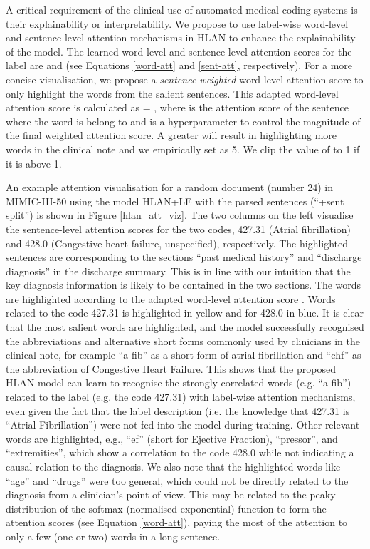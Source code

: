\documentclass[final,5p,times,twocolumn]{elsarticle}
\begin{document}
A critical requirement of the clinical use of automated medical coding systems is their explainability or interpretability. We propose to use label-wise word-level and sentence-level attention mechanisms in HLAN to enhance the explainability of the model. The learned word-level and sentence-level attention scores for the label  are  and  (see Equations \ref{word-att} and \ref{sent-att}, respectively). For a more concise visualisation, we propose a \textit{sentence-weighted} word-level attention score  to only highlight the words from the salient sentences. This adapted word-level attention score is calculated as  = , where  is the attention score of the sentence where the word is belong to and  is a hyperparameter to control the magnitude of the final weighted attention score. A greater  will result in highlighting more words in the clinical note and we empirically set  as 5. We clip the value of  to 1 if it is above 1.

An example attention visualisation for a random document (number 24) in MIMIC-III-50 using the model HLAN+LE with the parsed sentences (``+sent split'') is shown in Figure \ref{hlan_att_viz}. The two columns on the left visualise the sentence-level attention scores  for the two codes, 427.31 (Atrial fibrillation) and 428.0 (Congestive heart failure, unspecified), respectively. The highlighted sentences are corresponding to the sections ``past medical history'' and ``discharge diagnosis'' in the discharge summary. This is in line with our intuition that the key diagnosis information is likely to be contained in the two sections. The words are highlighted according to the adapted word-level attention score . Words related to the code 427.31 is highlighted in yellow and for 428.0 in blue. It is clear that the most salient words are highlighted, and the model successfully recognised the abbreviations and alternative short forms commonly used by clinicians in the clinical note, for example ``a fib'' as a short form of atrial fibrillation and ``chf'' as the abbreviation of Congestive Heart Failure. This shows that the proposed HLAN model can learn to recognise the strongly correlated words (e.g. ``a fib'') related to the label (e.g. the code 427.31) with label-wise attention mechanisms, even given the fact that the label description (i.e. the knowledge that 427.31 is ``Atrial Fibrillation'') were not fed into the model during training. Other relevant words are highlighted, e.g., ``ef'' (short for Ejective Fraction), ``pressor'', and ``extremities'', which show a correlation to the code 428.0 while not indicating a causal relation to the diagnosis. We also note that the highlighted words like ``age'' and ``drugs'' were too general, which could not be directly related to the diagnosis from a clinician's point of view. This may be related to the peaky distribution of the softmax (normalised exponential) function to form the attention scores (see Equation \ref{word-att}), paying the most of the attention to only a few (one or two) words in a long sentence.
\end{document}
